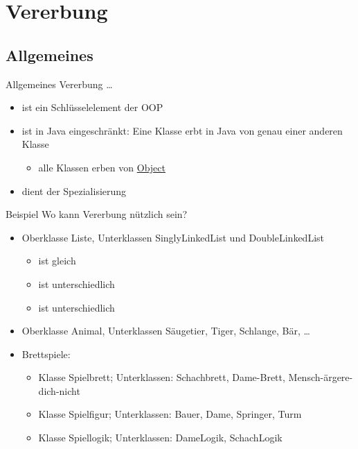 \documentclass[usepdftitle=false,hyperref={pdfpagelabels=false}]{beamer}
\begin{document}
\section{Vererbung}
\subsection{Allgemeines}
\begin{frame}{Allgemeines}
    Vererbung \dots
    \begin{itemize}[<+->]
        \item ist ein Schlüsselelement der OOP
        \item ist in Java eingeschränkt: Eine Klasse erbt in Java
              von genau einer anderen Klasse
            \begin{itemize}
              \item alle Klassen erben von \href{http://docs.oracle.com/javase/7/docs/api/java/lang/Object.html}{Object}
            \end{itemize}
        \item dient der Spezialisierung
    \end{itemize}
\end{frame}

\begin{frame}{Beispiel}
    Wo kann Vererbung nützlich sein?
    \begin{itemize}[<+->]
        \item Oberklasse Liste, Unterklassen SinglyLinkedList und
              DoubleLinkedList
          \begin{itemize}
            \item {} ist gleich
            \item {} ist unterschiedlich
            \item {} ist unterschiedlich
          \end{itemize}
        \item Oberklasse Animal, Unterklassen Säugetier, Tiger, Schlange, Bär, \dots
        \item Brettspiele:
            \begin{itemize}
                \item Klasse Spielbrett; Unterklassen: Schachbrett, Dame-Brett, Mensch-ärgere-dich-nicht
                \item Klasse Spielfigur; Unterklassen: Bauer, Dame, Springer, Turm
                \item Klasse Spiellogik; Unterklassen: DameLogik, SchachLogik
            \end{itemize}
    \end{itemize}
\end{frame}
\end{document}
